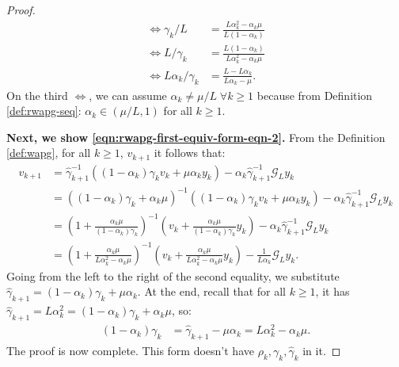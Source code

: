 \documentclass[12pt]{article}
\begin{document}
\begin{proof}
\begin{align*}
                \iff 
                \gamma_k/L
                &= 
                \frac{L \alpha_k^2 - \alpha_k\mu}{L (1 - \alpha_k)}
                \\
                \iff 
                L/\gamma_k
                &= 
                \frac{L (1 - \alpha_k)}{L \alpha_k^2 - \alpha_k\mu}
                \\
                \iff 
                L\alpha_k/\gamma_k
                &= 
                \frac{L - L\alpha_k}{L\alpha_k - \mu}. 
            \end{align*}
            On the third $\iff$, we can assume $\alpha_k \neq \mu/L\;  \forall k \ge 1$ because from Definition \ref{def:rwapg-seq}: $\alpha_k \in (\mu/L, 1)$ for all $k \ge 1$. 
            \par
            \textbf{Next, we show \eqref{eqn:rwapg-first-equiv-form-eqn-2}.}
            From the Definition \ref{def:wapg}, for all $k \ge 1$, $v_{k + 1}$ it follows that: 
            \begin{align*}
                v_{k + 1} &= 
                \hat \gamma_{k + 1}^{-1}
                ((1 - \alpha_k)\gamma_k v_k + \mu\alpha_k y_k)
                - \alpha_k\hat \gamma_{k + 1}^{-1}\mathcal G_L y_k
                \\
                &= 
                ((1 - \alpha_k)\gamma_k + \alpha_k \mu)^{-1}
                \left(
                    (1 - \alpha_k)\gamma_k v_k + \mu\alpha_k y_k
                \right)
                - \alpha_k\hat \gamma_{k + 1}^{-1}\mathcal G_L y_k
                \\
                &= 
                \left(
                    1 + \frac{\alpha_k\mu}{(1 - \alpha_k)\gamma_k}
                \right)^{-1}
                \left(
                    v_k + 
                    \frac{\alpha_k\mu}{(1 - \alpha_k)\gamma_k} y_k
                \right)
                - \alpha_k\hat \gamma_{k + 1}^{-1}\mathcal G_L y_k
                \\
                &= 
                \left(
                    1 + \frac{\alpha_k \mu}{L \alpha_k^2 - \alpha_k \mu}
                \right)^{-1}
                \left(
                    v_k + 
                    \frac{\alpha_k \mu}{L \alpha_k^2 - \alpha_k \mu} y_k
                \right)
                - \frac{1}{L\alpha_{k}}\mathcal G_L y_k. 
            \end{align*}
            Going from the left to the right of the second equality, we substitute $\hat \gamma_{k + 1} = (1 - \alpha_k)\gamma_k + \mu\alpha_k$. 
            At the end, recall that for all $k \ge 1$, it has $\hat \gamma_{k + 1} = L \alpha_k^2 = (1 - \alpha_k)\gamma_k + \alpha_k \mu$, so: 
            \begin{align*}
                (1 - \alpha_k)\gamma_k
                &= 
                \hat \gamma_{k + 1} - \mu \alpha_k
                = 
                L\alpha_{k}^2 - \alpha_k\mu. 
            \end{align*}
            The proof is now complete. 
            This form doesn't have $\rho_k, \gamma_k, \hat \gamma_k$ in it. 
        \end{proof}
        
\end{document}

